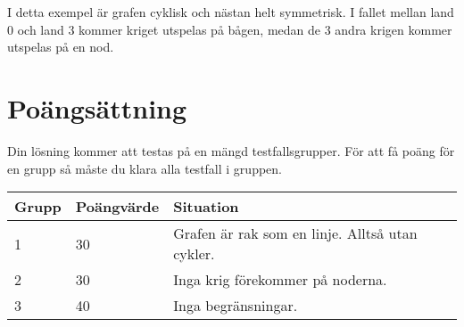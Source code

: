 I detta exempel är grafen cyklisk och nästan helt symmetrisk. I fallet mellan
land 0 och land 3 kommer kriget utspelas på bågen, medan de 3 andra krigen
kommer utspelas på en nod.

\section*{Poängsättning}

Din lösning kommer att testas på en mängd testfallsgrupper. För att få poäng för en grupp
så måste du klara alla testfall i gruppen.

\begin{tabular}{| l | l | l |}
\hline
Grupp & Poängvärde & Situation \\ \hline
1     & 30         & Grafen är rak som en linje. Alltså utan cykler. \\ \hline
2     & 30         & Inga krig förekommer på noderna. \\ \hline
3     & 40         & Inga begränsningar. \\ \hline
\end{tabular}
